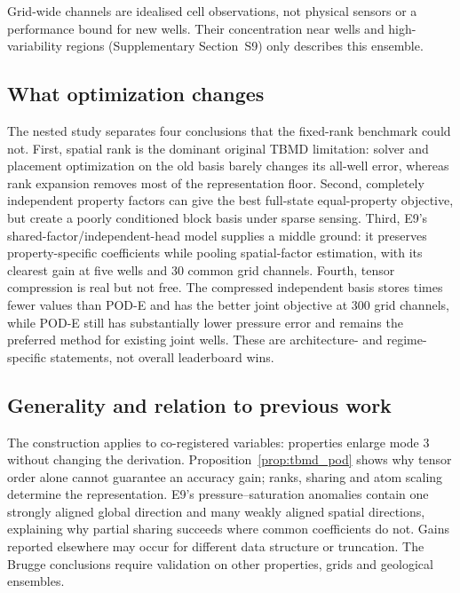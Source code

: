 Grid-wide channels are idealised cell observations, not physical sensors or a performance bound for new wells. Their concentration near wells and high-variability regions (Supplementary Section~S9) only describes this ensemble.

\subsection{What optimization changes}
The nested study separates four conclusions that the fixed-rank benchmark could not. First, spatial rank is the dominant original TBMD limitation: solver and placement optimization on the old basis barely changes its all-well error, whereas rank expansion removes most of the representation floor. Second, completely independent property factors can give the best full-state equal-property objective, but create a poorly conditioned block basis under sparse sensing. Third, E9's shared-factor/independent-head model supplies a middle ground: it preserves property-specific coefficients while pooling spatial-factor estimation, with its clearest gain at five wells and 30 common grid channels. Fourth, tensor compression is real but not free. The compressed independent basis stores \OptCompressionCompression{} times fewer values than POD-E and has the better joint objective at 300 grid channels, while POD-E still has substantially lower pressure error and remains the preferred method for existing joint wells. These are architecture- and regime-specific statements, not overall leaderboard wins.

\subsection{Generality and relation to previous work}
The construction applies to co-registered variables: properties enlarge mode 3 without changing the derivation. Proposition~\ref{prop:tbmd_pod} shows why tensor order alone cannot guarantee an accuracy gain; ranks, sharing and atom scaling determine the representation. E9's pressure--saturation anomalies contain one strongly aligned global direction and many weakly aligned spatial directions, explaining why partial sharing succeeds where common coefficients do not. Gains reported elsewhere \cite{zhong2024tbmd,farazmand2023} may occur for different data structure or truncation. The Brugge conclusions require validation on other properties, grids and geological ensembles.

